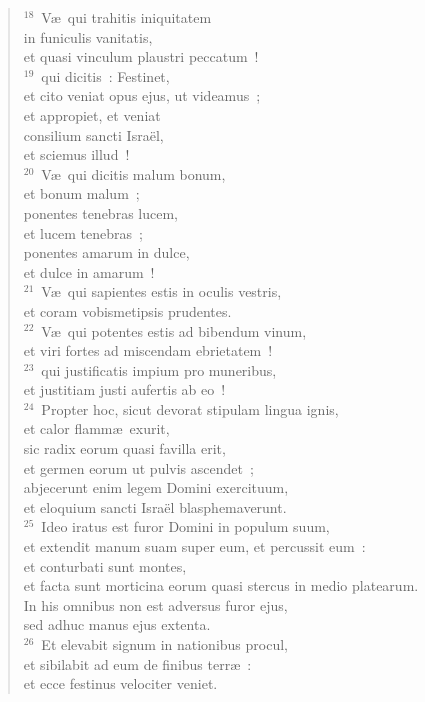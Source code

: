 \begin{verse}${}^{18}$~V\ae\ qui trahitis iniquitatem\\ in funiculis vanitatis,\\ et quasi vinculum plaustri peccatum~!\\
${}^{19}$~qui dicitis~: Festinet,\\ et cito veniat opus ejus, ut videamus~;\\ et appropiet, et veniat\\ consilium sancti Isra\"el,\\ et sciemus illud~!\\
${}^{20}$~V\ae\ qui dicitis malum bonum,\\ et bonum malum~;\\ ponentes tenebras lucem,\\ et lucem tenebras~;\\ ponentes amarum in dulce,\\ et dulce in amarum~!\\
${}^{21}$~V\ae\ qui sapientes estis in oculis vestris,\\ et coram vobismetipsis prudentes.\\
${}^{22}$~V\ae\ qui potentes estis ad bibendum vinum,\\ et viri fortes ad miscendam ebrietatem~!\\
${}^{23}$~qui justificatis impium pro muneribus,\\ et justitiam justi aufertis ab eo~!\\
${}^{24}$~Propter hoc, sicut devorat stipulam lingua ignis,\\ et calor flamm\ae\ exurit,\\ sic radix eorum quasi favilla erit,\\ et germen eorum ut pulvis ascendet~;\\ abjecerunt enim legem Domini exercituum,\\ et eloquium sancti Isra\"el blasphemaverunt.\\
${}^{25}$~Ideo iratus est furor Domini in populum suum,\\ et extendit manum suam super eum, et percussit eum~:\\ et conturbati sunt montes,\\ et facta sunt morticina eorum quasi stercus in medio platearum.\\ In his omnibus non est adversus furor ejus,\\ sed adhuc manus ejus extenta.\\
${}^{26}$~Et elevabit signum in nationibus procul,\\ et sibilabit ad eum de finibus terr\ae~:\\ et ecce festinus velociter veniet.\\

\end{verse}
